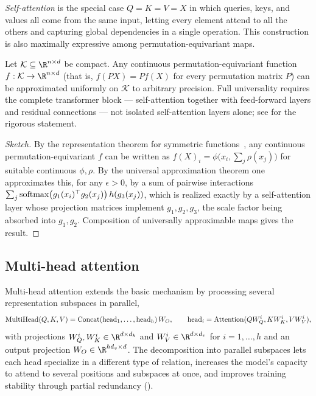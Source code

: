 \emph{Self-attention} is the special case $Q = K = V = X$ in which queries,
keys, and values all come from the same input, letting every element attend to
all the others and capturing global dependencies in a single operation. This
construction is also maximally expressive among permutation-equivariant maps.

\begin{theorem}
\label{thm:apps:self-attn-universal}
Let $\mathcal{K}\subseteq\R^{n\times d}$ be compact. Any continuous
permutation-equivariant function $f:\mathcal{K}\to\R^{n\times d}$ (that is,
$f(PX) = P f(X)$ for every permutation matrix $P$) can be approximated uniformly
on $\mathcal{K}$ to arbitrary precision. Full universality requires the complete
transformer block --- self-attention together with feed-forward layers and
residual connections --- not isolated self-attention layers alone; see
\citet{yun2020transformers} for the rigorous statement.
\end{theorem}

\begin{proof}[Sketch]
By the representation theorem for symmetric functions~\citep{zaheer2017deepsets},
any continuous permutation-equivariant $f$ can be written as
$f(X)_i = \phi\bigl(x_i, \sum_j \rho(x_j)\bigr)$ for suitable continuous
$\phi,\rho$. By the universal approximation theorem one approximates this, for
any $\epsilon>0$, by a sum of pairwise interactions
$\sum_j \operatorname{softmax}\bigl(g_1(x_i)^\top g_2(x_j)\bigr)\, h(g_3(x_j))$, which is
realized exactly by a self-attention layer whose projection matrices implement
$g_1,g_2,g_3$, the scale factor being absorbed into $g_1,g_2$. Composition of
universally approximable maps gives the result.
\end{proof}

\subsection{Multi-head attention}
\label{subsec:apps:multihead}

Multi-head attention extends the basic mechanism by processing several
representation subspaces in parallel,
\[
  \operatorname{MultiHead}(Q,K,V) = \operatorname{Concat}(\mathrm{head}_1,\dots,\mathrm{head}_h)\,W_O,
  \qquad
  \mathrm{head}_i = \operatorname{Attention}(QW_Q^i, KW_K^i, VW_V^i),
\]
with projections $W_Q^i, W_K^i \in \R^{d\times d_k}$ and
$W_V^i \in \R^{d\times d_v}$ for $i = 1,\dots,h$ and an output projection
$W_O \in \R^{hd_v\times d}$. The decomposition into parallel subspaces lets each
head specialize in a different type of relation, increases the model's capacity
to attend to several positions and subspaces at once, and improves training
stability through partial redundancy ().

